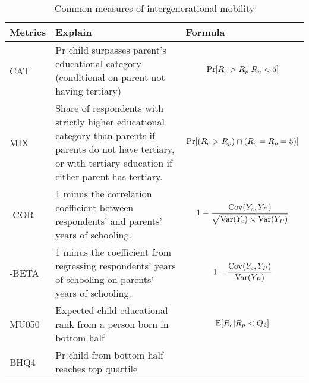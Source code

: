 \begin{table}[!ht]
    \centering
    \caption{Common measures of intergenerational mobility}
    \renewcommand{\arraystretch}{1.5} 
    \begin{tabular}{|m{}|m{}|m{}|}
    \hline
    \centering \textbf{Metrics} & \centering \textbf{Explain} & \centering \textbf{Formula} \tabularnewline
    \hline
    \centering CAT & \raggedright Pr child surpasses parent’s educational category (conditional on parent not having tertiary) & \centering
    \begin{equation*}
    \operatorname{Pr}[ R_{c}  >R_{p} |R_{p} < 5]
    \vspace{-1em}\end{equation*} \tabularnewline
    \hline
    \centering MIX & \raggedright Share of respondents with strictly higher educational category than parents if parents do not have tertiary, or with tertiary education if either parent has tertiary. & \centering
    \begin{equation*}
    \operatorname{Pr}[( R_{c}  >R_{p}) \cap ( R_{c} =R_{p} =5)]
    \vspace{-1em}\end{equation*} \tabularnewline
    \hline
    \centering 1-COR & \raggedright 1 minus the correlation coefficient between respondents' and parents' years of schooling. & \centering
    \begin{equation*}
    1-\frac{\operatorname{Cov}( Y_{c} ,Y_{P})}{\sqrt{\operatorname{Var}( Y_{c}) \times \operatorname{Var}( Y_{P})}}
    \vspace{-1em}\end{equation*} \tabularnewline
    \hline
    \centering 1-BETA & \raggedright 1 minus the coefficient from regressing respondents' years of schooling on parents' years of schooling. & \centering
    \begin{equation*}
    1-\frac{\operatorname{Cov}( Y_{c} ,Y_{P})}{\operatorname{Var}( Y_{P})}
    \vspace{-1em}\end{equation*} \tabularnewline
    \hline
    \centering MU050 & \raggedright Expected child educational rank from a person born in bottom half & \centering
    \begin{equation*}
    \operatorname{\mathbb{E}}[ R_{c} |R_{p} < Q_{2}]
    \vspace{-1em}\end{equation*} \tabularnewline
    \hline
    \centering BHQ4 & \raggedright Pr child from bottom half reaches top quartile & \centering

\end{tabular}
\end{table}
